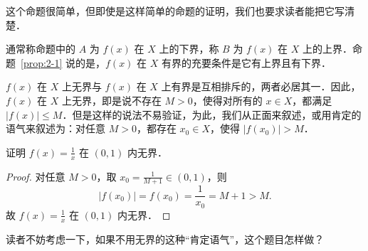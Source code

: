 这个命题很简单，但即使是这样简单的命题的证明，我们也要求读者能把它写清楚．

通常称命题中的 $A$ 为 $f(x)$ 在 $X$ 上的下界，称 $B$ 为 $f(x)$ 在 $X$ 上的上界．命题~\ref{prop:2-1} 说的是，$f(x)$ 在 $X$ 有界的充要条件是它有上界且有下界．

$f(x)$ 在 $X$ 上无界与 $f(x)$ 在 $X$ 上有界是互相排斥的，两者必居其一．因此，$f(x)$ 在 $X$ 上无界，即是说不存在 $M>0$，使得对所有的 $x\in X$，都满足 $|f(x)|\leqslant M$．但是这样的说法不易验证，为此，我们从正面来叙述，或用肯定的语气来叙述为：对任意 $M>0$，都存在 $x_0\in X$，使得 $|f(x_0)|>M$．

\begin{example}\label{ex:2-1-7}
证明 $f(x)=\frac{1}{x}$ 在 $(0,1)$ 内无界．
\end{example}

\begin{proof}
对任意 $M>0$，取 $x_0=\frac{1}{M+1}\in(0,1)$，则
\[
|f(x_0)|=f(x_0)=\frac{1}{x_0}=M+1>M.
\]
故 $f(x)=\frac{1}{x}$ 在 $(0,1)$ 内无界．
\end{proof}

读者不妨考虑一下，如果不用无界的这种“肯定语气”，这个题目怎样做？

